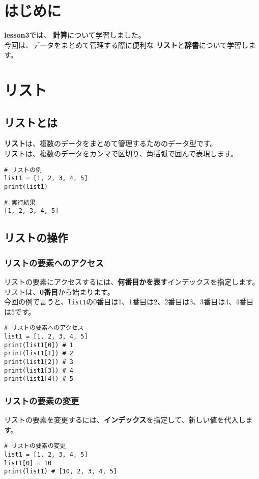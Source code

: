 \documentclass[a4paper,titlepage,dvipdfmx]{jarticle}
\begin{document}
\section{はじめに}
\textbf{lesson3}では、
\textbf{計算}について学習しました。\\
今回は、データをまとめて管理する際に便利な
\textbf{リスト}と\textbf{辞書}について学習します。
\section{リスト}
\subsection{リストとは}
\textbf{リスト}は、複数のデータをまとめて管理するためのデータ型です。\\
リストは、複数のデータをカンマで区切り、角括弧で囲んで表現します。\\
\begin{lstlisting}[caption=リストの例,label=リストの例]
# リストの例
list1 = [1, 2, 3, 4, 5]
print(list1)
\end{lstlisting}
\begin{lstlisting}[caption=リストの例の実行結果,label=リストの例の実行結果]
# 実行結果
[1, 2, 3, 4, 5]
\end{lstlisting}
\subsection{リストの操作}
\subsubsection{リストの要素へのアクセス}
リストの要素にアクセスするには、\textbf{何番目かを表す}インデックスを指定します。\\
リストは、\textbf{0番目}から始まります。\\
今回の例で言うと、\texttt{list1}の0番目は1、1番目は2、2番目は3、3番目は4、4番目は5です。\\
\begin{lstlisting}[caption=リストの要素へのアクセス,label=リストの要素へのアクセス]
# リストの要素へのアクセス
list1 = [1, 2, 3, 4, 5]
print(list1[0]) # 1
print(list1[1]) # 2
print(list1[2]) # 3
print(list1[3]) # 4
print(list1[4]) # 5
\end{lstlisting}

\subsubsection{リストの要素の変更}
リストの要素を変更するには、\textbf{インデックス}を指定して、新しい値を代入します。\\
\begin{lstlisting}[caption=リストの要素の変更,label=リストの要素の変更]
# リストの要素の変更
list1 = [1, 2, 3, 4, 5]
list1[0] = 10
print(list1) # [10, 2, 3, 4, 5]
\end{lstlisting}
\end{document}
